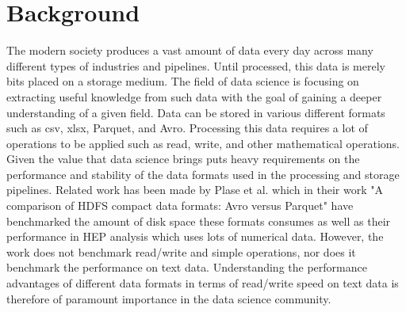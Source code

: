 \documentclass[12pt,twoside,english]{article}
\begin{document}
\section{Background}
\label{sect:background}
The modern society produces a vast amount of data every day across many different types of industries and pipelines. Until processed, this data is merely bits placed on a storage medium. The field of data science is focusing on extracting useful knowledge from such data with the goal of gaining a deeper understanding of a given field. Data can be stored in various different formats such as csv, xlsx, Parquet, and Avro. Processing this data requires a lot of operations to be applied such as read, write, and other mathematical operations. Given the value that data science brings puts heavy requirements on the performance and stability of the data formats used in the processing and storage pipelines. Related work has been made by Plase et al. which in their work "A comparison of HDFS compact data formats: Avro versus Parquet" have benchmarked the amount of disk space these formats consumes as well as their performance in \gls{HEP} analysis which uses lots of numerical data. However, the work does not benchmark read/write and simple operations, nor does it benchmark the performance on text data. Understanding the performance advantages of different data formats in terms of read/write speed on text data is therefore of paramount importance in the data science community\cite{plase_comparison_2017}.


\begin{comment}
This project builds on the basis of previous work's comparison on different data formats, such as comparing the compact data formats like Avro and Parquet in HDFS, or data formats for a specific field such as \gls{HEP} analysis. \cite{plase_comparison_2017, blomer_quantitative_2018}.

We will use the quantitative method introduced from before those previous work, such as the file stability test using bit flip, but with the time constraint, we will only be performing the benchmark against 3 or 4 common file formats (csv, parquet, avro, and xlsx if time permits) used in Data Science.
\end{comment}
\end{document}
